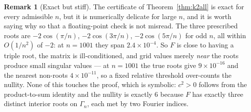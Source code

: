 \documentclass[11pt]{article}
\theoremstyle{definition}
\newtheorem{remark}[theorem]{Remark}
\begin{document}
\begin{remark}[Exact but stiff]
The certificate of Theorem~\ref{thm:k2all} is exact for every admissible $n$,
but it is numerically delicate for large $n$, and it is worth saying why so that
a floating-point check is not misread. The three prescribed roots are
$-2\cos(\pi/n)$, $-2\cos(3\pi/n)$, $-2\cos(5\pi/n)$ for odd $n$, all within
$O(1/n^{2})$ of $-2$: at $n=1001$ they span $2.4\times10^{-4}$. So $F$ is close
to having a triple root, the matrix is ill-conditioned, and grid values merely
\emph{near} the roots produce small singular values --- at $n=1001$ the true
roots give $9\times10^{-16}$ and the nearest non-roots $4\times10^{-11}$, so a
fixed relative threshold over-counts the nullity. None of this touches the
proof, which is symbolic: $c^{2}>0$ follows from the product-to-sum identity and
the nullity is exactly $6$ because $F$ has exactly three distinct interior roots
on $\Gamma_n$, each met by two Fourier indices.
\end{remark}
\end{document}
